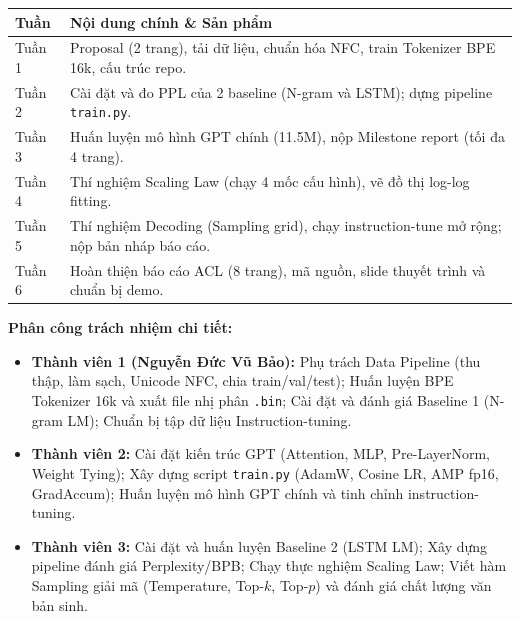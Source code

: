 \documentclass[11pt,a4paper]{article}
\begin{document}
\begin{table}[h]
\centering
\small
\begin{tabular}{lp{5.5cm}}
\toprule
\textbf{Tuần} & \textbf{Nội dung chính \& Sản phẩm} \\
\midrule
Tuần 1 & Proposal (2 trang), tải dữ liệu, chuẩn hóa NFC, train Tokenizer BPE 16k, cấu trúc repo. \\
Tuần 2 & Cài đặt và đo PPL của 2 baseline (N-gram và LSTM); dựng pipeline \texttt{train.py}. \\
Tuần 3 & Huấn luyện mô hình GPT chính (11.5M), nộp Milestone report (tối đa 4 trang). \\
Tuần 4 & Thí nghiệm Scaling Law (chạy 4 mốc cấu hình), vẽ đồ thị log-log fitting. \\
Tuần 5 & Thí nghiệm Decoding (Sampling grid), chạy instruction-tune mở rộng; nộp bản nháp báo cáo. \\
Tuần 6 & Hoàn thiện báo cáo ACL (8 trang), mã nguồn, slide thuyết trình và chuẩn bị demo. \\
\bottomrule
\end{tabular}
\end{table}

\noindent \textbf{Phân công trách nhiệm chi tiết:}
\begin{itemize}
    \item \textbf{Thành viên 1 (Nguyễn Đức Vũ Bảo):} Phụ trách Data Pipeline (thu thập, làm sạch, Unicode NFC, chia train/val/test); Huấn luyện BPE Tokenizer 16k và xuất file nhị phân \texttt{.bin}; Cài đặt và đánh giá Baseline 1 (N-gram LM); Chuẩn bị tập dữ liệu Instruction-tuning.
    \item \textbf{Thành viên 2:} Cài đặt kiến trúc GPT (Attention, MLP, Pre-LayerNorm, Weight Tying); Xây dựng script \texttt{train.py} (AdamW, Cosine LR, AMP fp16, GradAccum); Huấn luyện mô hình GPT chính và tinh chỉnh instruction-tuning.
    \item \textbf{Thành viên 3:} Cài đặt và huấn luyện Baseline 2 (LSTM LM); Xây dựng pipeline đánh giá Perplexity/BPB; Chạy thực nghiệm Scaling Law; Viết hàm Sampling giải mã (Temperature, Top-$k$, Top-$p$) và đánh giá chất lượng văn bản sinh.
\end{itemize}



\end{document}
